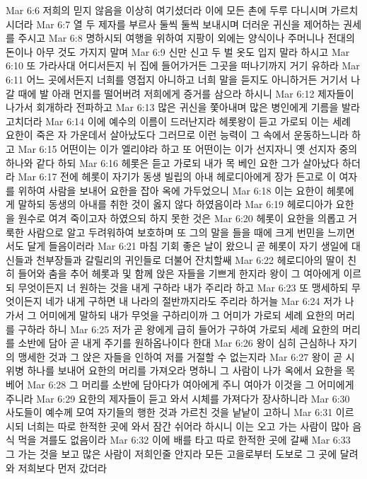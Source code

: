 Mar 6:6  저희의 믿지 않음을 이상히 여기셨더라 이에 모든 촌에 두루 다니시며 가르치시더라
Mar 6:7  열 두 제자를 부르사 둘씩 둘씩 보내시며 더러운 귀신을 제어하는 권세를 주시고
Mar 6:8  명하시되 여행을 위하여 지팡이 외에는 양식이나 주머니나 전대의 돈이나 아무 것도 가지지 말며
Mar 6:9  신만 신고 두 벌 옷도 입지 말라 하시고
Mar 6:10  또 가라사대 어디서든지 뉘 집에 들어가거든 그곳을 떠나기까지 거기 유하라
Mar 6:11  어느 곳에서든지 너희를 영접지 아니하고 너희 말을 듣지도 아니하거든 거기서 나갈 때에 발 아래 먼지를 떨어버려 저희에게 증거를 삼으라 하시니
Mar 6:12  제자들이 나가서 회개하라 전파하고
Mar 6:13  많은 귀신을 쫓아내며 많은 병인에게 기름을 발라 고치더라
Mar 6:14  이에 예수의 이름이 드러난지라 헤롯왕이 듣고 가로되 이는 세례 요한이 죽은 자 가운데서 살아났도다 그러므로 이런 능력이 그 속에서 운동하느니라 하고
Mar 6:15  어떤이는 이가 엘리야라 하고 또 어떤이는 이가 선지자니 옛 선지자 중의 하나와 같다 하되
Mar 6:16  헤롯은 듣고 가로되 내가 목 베인 요한 그가 살아났다 하더라
Mar 6:17  전에 헤롯이 자기가 동생 빌립의 아내 헤로디아에게 장가 든고로 이 여자를 위하여 사람을 보내어 요한을 잡아 옥에 가두었으니
Mar 6:18  이는 요한이 헤롯에게 말하되 동생의 아내를 취한 것이 옳지 않다 하였음이라
Mar 6:19  헤로디아가 요한을 원수로 여겨 죽이고자 하였으되 하지 못한 것은
Mar 6:20  헤롯이 요한을 의롭고 거룩한 사람으로 알고 두려워하여 보호하며 또 그의 말을 들을 때에 크게 번민을 느끼면서도 달게 들음이러라
Mar 6:21  마침 기회 좋은 날이 왔으니 곧 헤롯이 자기 생일에 대신들과 천부장들과 갈릴리의 귀인들로 더불어 잔치할쌔
Mar 6:22  헤로디아의 딸이 친히 들어와 춤을 추어 헤롯과 및 함께 앉은 자들을 기쁘게 한지라 왕이 그 여아에게 이르되 무엇이든지 너 원하는 것을 내게 구하라 내가 주리라 하고
Mar 6:23  또 맹세하되 무엇이든지 네가 내게 구하면 내 나라의 절반까지라도 주리라 하거늘
Mar 6:24  저가 나가서 그 어미에게 말하되 내가 무엇을 구하리이까 그 어미가 가로되 세례 요한의 머리를 구하라 하니
Mar 6:25  저가 곧 왕에게 급히 들어가 구하여 가로되 세례 요한의 머리를 소반에 담아 곧 내게 주기를 원하옵나이다 한대
Mar 6:26  왕이 심히 근심하나 자기의 맹세한 것과 그 앉은 자들을 인하여 저를 거절할 수 없는지라
Mar 6:27  왕이 곧 시위병 하나를 보내어 요한의 머리를 가져오라 명하니 그 사람이 나가 옥에서 요한을 목 베어
Mar 6:28  그 머리를 소반에 담아다가 여아에게 주니 여아가 이것을 그 어미에게 주니라
Mar 6:29  요한의 제자들이 듣고 와서 시체를 가져다가 장사하니라
Mar 6:30  사도들이 예수께 모여 자기들의 행한 것과 가르친 것을 낱낱이 고하니
Mar 6:31  이르시되 너희는 따로 한적한 곳에 와서 잠간 쉬어라 하시니 이는 오고 가는 사람이 많아 음식 먹을 겨를도 없음이라
Mar 6:32  이에 배를 타고 따로 한적한 곳에 갈쌔
Mar 6:33  그 가는 것을 보고 많은 사람이 저희인줄 안지라 모든 고을로부터 도보로 그 곳에 달려와 저희보다 먼저 갔더라
